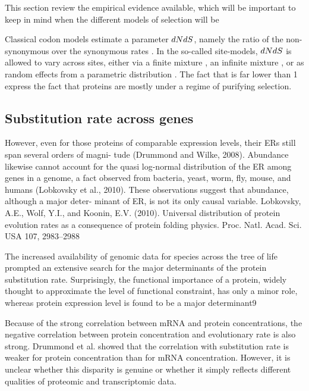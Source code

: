 This section review the empirical evidence available, which will be important to keep in mind when the different models of selection will be 

Classical \gls{codon} models estimate a parameter $dNdS$, namely the ratio of the non-synonymous over the \gls{synonymous} rates \citep{Muse1994,Goldman1994}. In the so-called site-models, $dNdS$ is allowed to vary across sites, either via a finite mixture \citep{Yang2001}, an infinite mixture \citep{Huelsenbeck2006}, or as random effects from a parametric distribution \citep{lartillot_phylobayes_2013}. 
The fact that is far lower than 1 express the fact that proteins are mostly under a regime of purifying selection.

\subsection{Substitution rate across genes}

However, even for those proteins of comparable expression levels, their ERs still span several orders of magni- tude (Drummond and Wilke, 2008). Abundance likewise cannot account for the quasi log-normal distribution of the ER among genes in a genome, a fact observed from bacteria, yeast, worm, fly, mouse, and humans (Lobkovsky et al., 2010). These observations suggest that abundance, although a major deter- minant of ER, is not its only causal variable.
Lobkovsky, A.E., Wolf, Y.I., and Koonin, E.V. (2010). Universal distribution of protein evolution rates as a consequence of protein folding physics. Proc. Natl. Acad. Sci. USA 107, 2983–2988

The increased availability of genomic data for species across the tree of life prompted an extensive search for the major determinants of the protein \gls{substitution} rate. Surprisingly, the functional importance of a protein, widely thought to approximate the level of functional constraint, has only a minor role, whereas protein expression level is found to be a major determinant9 \citep{Zhang2015}

Because of the strong correlation between mRNA and protein concentrations, the negative correlation between protein concentration and evolutionary rate is also strong.
Drummond et al. showed that the correlation with \gls{substitution} rate is weaker for protein concentration than for mRNA concentration.
However, it is unclear whether this disparity is genuine or whether it simply reflects different qualities of proteomic and transcriptomic data.

